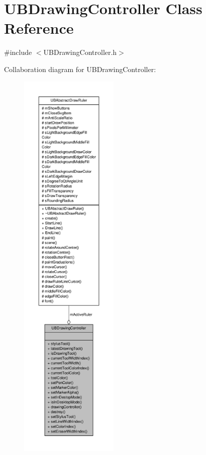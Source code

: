 \hypertarget{class_u_b_drawing_controller}{\section{U\-B\-Drawing\-Controller Class Reference}
\label{d0/d58/class_u_b_drawing_controller}
}


{\ttfamily \#include $<$U\-B\-Drawing\-Controller.\-h$>$}



Collaboration diagram for U\-B\-Drawing\-Controller\-:
\nopagebreak
\begin{figure}[H]
\begin{center}
\leavevmode
\includegraphics[height=550pt]{d0/dd0/class_u_b_drawing_controller__coll__graph}
\end{center}
\end{figure}
